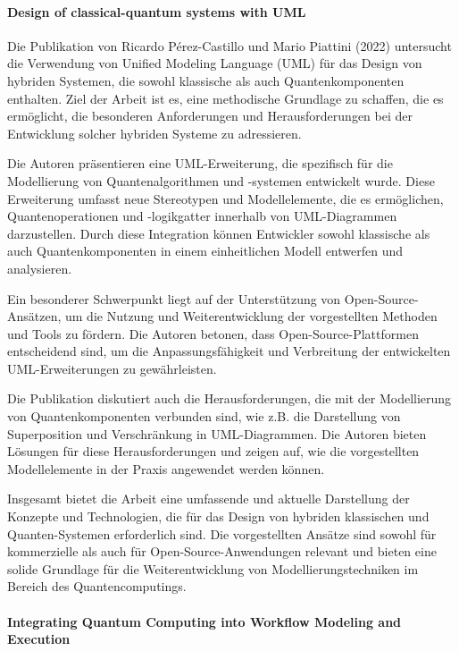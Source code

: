 \paragraph{Design of classical-quantum systems with UML}

Die Publikation von Ricardo Pérez-Castillo und Mario Piattini (2022) untersucht die Verwendung von Unified Modeling 
Language (UML) für das Design von hybriden Systemen, die sowohl klassische als auch Quantenkomponenten enthalten. 
Ziel der Arbeit ist es, eine methodische Grundlage zu schaffen, die es ermöglicht, die besonderen Anforderungen und 
Herausforderungen bei der Entwicklung solcher hybriden Systeme zu adressieren.

Die Autoren präsentieren eine UML-Erweiterung, die spezifisch für die Modellierung von Quantenalgorithmen und -systemen 
entwickelt wurde. Diese Erweiterung umfasst neue Stereotypen und Modellelemente, die es ermöglichen, Quantenoperationen 
und -logikgatter innerhalb von UML-Diagrammen darzustellen. Durch diese Integration können Entwickler sowohl klassische 
als auch Quantenkomponenten in einem einheitlichen Modell entwerfen und analysieren.

Ein besonderer Schwerpunkt liegt auf der Unterstützung von Open-Source-Ansätzen, um die Nutzung und Weiterentwicklung der 
vorgestellten Methoden und Tools zu fördern. Die Autoren betonen, dass Open-Source-Plattformen entscheidend sind, um die 
Anpassungsfähigkeit und Verbreitung der entwickelten UML-Erweiterungen zu gewährleisten.

Die Publikation diskutiert auch die Herausforderungen, die mit der Modellierung von Quantenkomponenten verbunden sind, 
wie z.B. die Darstellung von Superposition und Verschränkung in UML-Diagrammen. Die Autoren bieten Lösungen für diese 
Herausforderungen und zeigen auf, wie die vorgestellten Modellelemente in der Praxis angewendet werden können.

Insgesamt bietet die Arbeit eine umfassende und aktuelle Darstellung der Konzepte und Technologien, die für das Design 
von hybriden klassischen und Quanten-Systemen erforderlich sind. Die vorgestellten Ansätze sind sowohl für kommerzielle 
als auch für Open-Source-Anwendungen relevant und bieten eine solide Grundlage für die Weiterentwicklung von Modellierungstechniken 
im Bereich des Quantencomputings.

\paragraph{Integrating Quantum Computing into Workflow Modeling and Execution}

